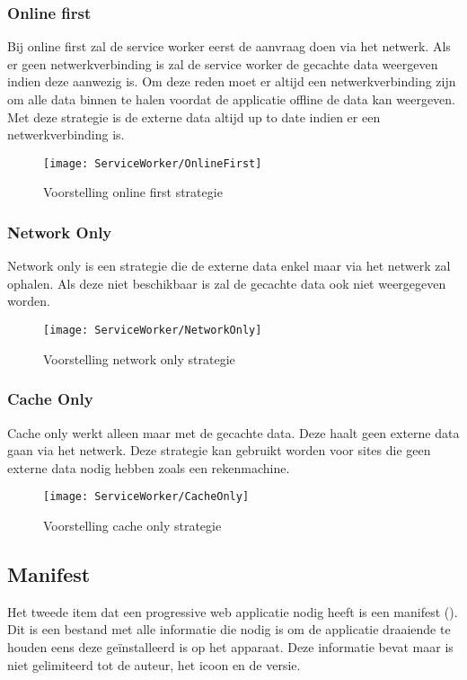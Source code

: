 \subsubsection{Online first}
Bij online first zal de service worker eerst de aanvraag doen via het netwerk. Als er geen netwerkverbinding is zal de service worker de gecachte data weergeven indien deze aanwezig is. Om deze reden moet er altijd een netwerkverbinding zijn om alle data binnen te halen voordat de applicatie offline de data kan weergeven. Met deze strategie is de externe data altijd up to date indien er een netwerkverbinding is.

\begin{figure}[!h]
	\texttt{[image: ServiceWorker/OnlineFirst]}\centering
	\caption{Voorstelling online first strategie}
\end{figure}

\subsubsection{Network Only}
Network only is een strategie die de externe data enkel maar via het netwerk zal ophalen. Als deze niet beschikbaar is zal de gecachte data ook niet weergegeven worden.

\begin{figure}[!h]
	\texttt{[image: ServiceWorker/NetworkOnly]}\centering
	\caption{Voorstelling network only strategie}
\end{figure}

\subsubsection{Cache Only}
Cache only werkt alleen maar met de gecachte data. Deze haalt geen externe data gaan via het netwerk. Deze strategie kan gebruikt worden voor sites die geen externe data nodig hebben zoals een rekenmachine.

\begin{figure}[!h]
	\texttt{[image: ServiceWorker/CacheOnly]}\centering
	\caption{Voorstelling cache only strategie}
\end{figure}

\subsection{Manifest}
Het tweede item dat een progressive web applicatie nodig heeft is een manifest (\cite{MANIFEST}). Dit is een bestand met alle informatie die nodig is om de applicatie draaiende te houden eens deze geïnstalleerd is op het apparaat. Deze informatie bevat maar is niet gelimiteerd tot de auteur, het icoon en de versie.


